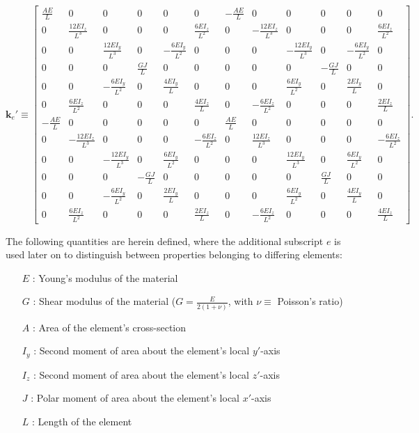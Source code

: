 \documentclass[12pt,a4paper,article]{memoir} %
\begin{document}
\begin{equation}
	\mathbf{k}_e' \equiv \left[ \begin{array}{cccccccccccc} \frac{AE}{L} &  0 &  0 &  0 &  0 &  0 & -\frac{AE}{L} &  0 &  0 &  0 &  0 &  0 \\
                                                                  0 & \frac{12EI_z}{L^3} &  0 &  0 &  0 & \frac{6EI_z}{L^2} &  0 & -\frac{12EI_z}{L^3} &  0 &  0 &  0 & \frac{6EI_z}{L^2} \\
     						  0 &  0 & \frac{12EI_y}{L^3} &  0 & -\frac{6EI_y}{L^2} &  0 &  0 &  0 & -\frac{12EI_y}{L^3} &  0 & -\frac{6EI_y}{L^2} &  0 \\
     						0 &  0 &  0 & \frac{GJ}{L} &  0 &  0 &  0 &  0 &  0 & -\frac{GJ}{L} &  0 &  0 \\
    						 0 &  0 & -\frac{6EI_y}{L^2} &  0 & \frac{4EI_y}{L} &  0 &  0 &  0 & \frac{6EI_y}{L^2} &  0 & \frac{2EI_y}{L} &  0 \\
    						 0 & \frac{6EI_z}{L^2} &  0 &  0 &  0 & \frac{4EI_z}{L} &  0 & -\frac{6EI_z}{L^2} &  0 &  0 &  0 & \frac{2EI_z}{L} \\
    						-\frac{AE}{L} &  0 &  0 &  0 &  0 &  0 & \frac{AE}{L} &  0 &  0 &  0 &  0 &  0 \\
   						  0 & -\frac{12EI_z}{L^3} &  0 &  0 &  0 & -\frac{6EI_z}{L^2} &  0 & \frac{12EI_z}{L^3} &  0 &  0 &  0 & -\frac{6EI_z}{L^2} \\
   						  0 &  0 & -\frac{12EI_y}{L^3} &  0 & \frac{6EI_y}{L^2} &  0 &  0 &  0 & \frac{12EI_y}{L^3} &  0 & \frac{6EI_y}{L^2} &  0 \\
   						  0 &  0 &  0 & -\frac{GJ}{L} &  0 &  0 &  0 &  0 &  0 & \frac{GJ}{L} &  0 &  0 \\
    						 0 &  0 & -\frac{6EI_y}{L^2} &  0 & \frac{2EI_y}{L} &  0 &  0 &  0 & \frac{6EI_y}{L^2} &  0 & \frac{4EI_y}{L} &  0 \\
   						  0 & \frac{6EI_z}{L^2} &  0 &  0 &  0 & \frac{2EI_z}{L} &  0 & -\frac{6EI_z}{L^2} &  0 &  0 &  0 & \frac{4EI_z}{L} \end{array} \right].
\end{equation}
\setlength\arraycolsep{5pt} %

The following quantities are herein defined, where the additional subscript $e$ is used later on to distinguish between properties belonging to differing elements:
\begin{itemize}
	\item[$E$]: Young's modulus of the material
	\item[$G$]: Shear modulus of the material ($G = \frac{E}{2(1+\nu)}$, with $\nu \equiv$ Poisson's ratio)
	\item[$A$]: Area of the element's cross-section
	\item[$I_y$]: Second moment of area about the element's local $y'$-axis
	\item[$I_z$]: Second moment of area about the element's local $z'$-axis
	\item[$J$]: Polar moment of area about the element's local $x'$-axis
	\item[$L$]: Length of the element
\end{itemize}
\end{document}
